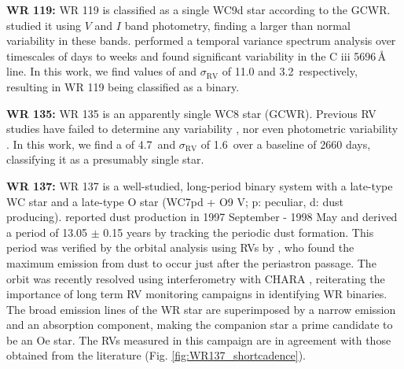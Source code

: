 \textbf{WR 119:} WR 119 is classified as a single WC9d star according to the GCWR. \citet{2009Fahed} studied it using $V$ and $I$ band photometry, finding a larger than normal variability in these bands. \citet{2017Desforges} performed a temporal variance spectrum analysis over timescales of days to weeks and found significant variability in the  C {\sc iii} 5696\,\r{A} line. In this work, we find values of \DelRV{} and $\sigma_\textrm{RV}$ of 11.0 and 3.2\,\kms{} respectively, resulting in WR 119 being classified as a binary.


\textbf{WR 135:} WR 135 is an apparently single WC8 star (GCWR). Previous RV studies have failed to determine any variability \citep{1999aNiemela}, nor even photometric variability \citep{1986MoffatShara}. In this work, we find a \DelRV{} of 4.7\,\kms{} and $\sigma_\textrm{RV}$ of 1.6\,\kms{} over a baseline of 2660 days, classifying it as a presumably single star.

\textbf{WR 137:} WR 137 is a well-studied, long-period binary system with a late-type WC star and a late-type O star (WC7pd + O9 V; p: peculiar, d: dust producing). \citet{1999MarchenkoDust} reported dust production in 1997 September - 1998 May and \citet{2001WilliamsDust} derived a period of 13.05 $\pm$ 0.15 years by tracking the periodic dust formation. This period was verified by the orbital analysis using RVs by \citet{2005Lefevre}, who found the maximum emission from dust to occur just after the periastron passage. The orbit was recently resolved using interferometry with CHARA \citep{2016Richardson}, reiterating the importance of long term RV monitoring campaigns in identifying WR binaries. The broad emission lines of the WR star are superimposed by a narrow emission and an absorption component, making the companion star a prime candidate to be an Oe star. The RVs measured in this campaign are in agreement with those obtained from the literature (Fig. \ref{fig:WR137_shortcadence}).

